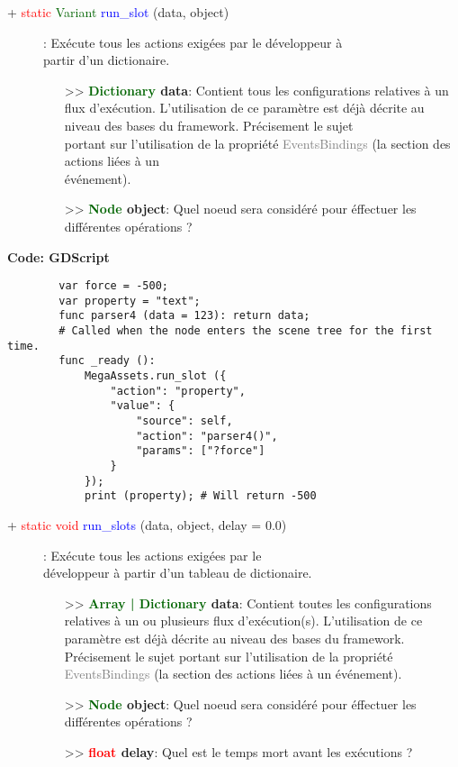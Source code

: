 \documentclass[a4paper, 11pt]{article}
\begin{document}
	\begin{description}
		\item [+ \textcolor{red}{static} \textcolor{darkgreen}{Variant} \textcolor{blue}{run\_slot} (data, 
		object)]: Exécute tous les actions exigées par le développeur à \\partir d'un dictionaire.
		\begin{itemize}
			\item[>> \textbf{\textcolor{darkgreen}{Dictionary} data}:] Contient tous les configurations 
			relatives à un flux d'exécution. L'utilisation de ce paramètre est déjà décrite au niveau des
			bases du framework. Précisement le sujet \\portant sur l'utilisation de la propriété 
			\textcolor{gray}{EventsBindings} (la section des actions liées à un \\événement).
			\item [>> \textbf{\textcolor{darkgreen}{Node} object}:] Quel noeud sera considéré pour éffectuer
			les différentes opérations ?\\
		\end{itemize}
	\end{description}
	\textbf{Code: GDScript}
	\begin{lstlisting}
		var force = -500;
		var property = "text";
		func parser4 (data = 123): return data;
		# Called when the node enters the scene tree for the first time.
		func _ready ():
			MegaAssets.run_slot ({
				"action": "property",
				"value": {
					"source": self,
					"action": "parser4()",
					"params": ["?force"]
				}
			});
			print (property); # Will return -500
	\end{lstlisting}
	\begin{description}
		\item [+ \textcolor{red}{static void} \textcolor{blue}{run\_slots} (data, object, delay = 0.0)]: 
		Exécute tous les actions exigées par le \\développeur à partir d'un tableau de dictionaire.
		\begin{itemize}
			\item[>> \textbf{\textcolor{darkgreen}{Array | Dictionary} data}:] Contient toutes les 
			configurations relatives à un ou plusieurs flux d'exécution(s). L'utilisation de ce paramètre 
			est déjà décrite au niveau des bases du framework. Précisement le sujet portant sur
			l'utilisation de la propriété \textcolor{gray}{EventsBindings} (la section des actions liées à 
			un événement).
			\item [>> \textbf{\textcolor{darkgreen}{Node} object}:] Quel noeud sera considéré pour éffectuer
			les différentes opérations ?
			\item[>> \textbf{\textcolor{red}{float} delay}:] Quel est le temps mort avant les exécutions ?\\
		\end{itemize}
	\end{description}
\end{document}
